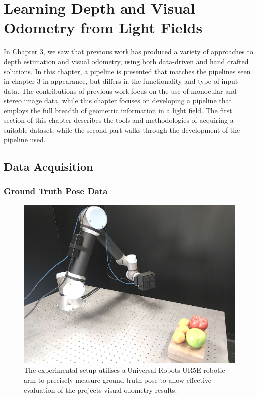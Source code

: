 \documentclass[openany]{book}
\begin{document}
\chapter{Learning Depth and Visual Odometry from Light Fields}

In Chapter 3, we saw that previous work has produced a variety of approaches to depth estimation and visual odometry, using both data-driven and hand crafted solutions. In this chapter, a pipeline is presented that matches the pipelines seen in chapter 3 in appearance, but differs in the functionality and type of input data. The contributions of previous work focus on the use of monocular and stereo image data, while this chapter focuses on developing a pipeline that employs the full breadth of geometric information in a light field. The first section of this chapter describes the tools and methodologies of acquiring a suitable dataset, while the second part walks through the development of the pipeline used.

\section{Data Acquisition}

\subsection{Ground Truth Pose Data}

\begin{figure}[h]
    \centering 
    \includegraphics[width=4.5in]{images/experimentalsetup2.jpg}
    \caption{The experimental setup utilises a Universal Robots UR5E robotic arm to precisely measure ground-truth pose to allow effective evaluation of the projects visual odometry results.}
\end{figure}
\end{document}
